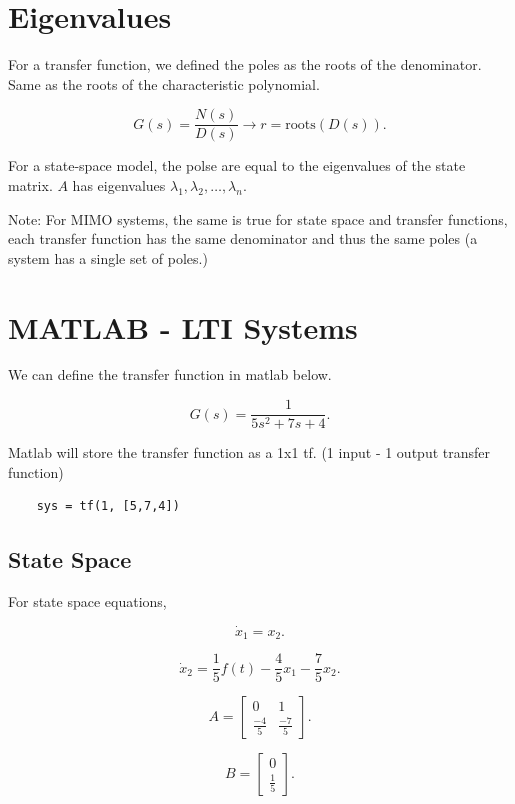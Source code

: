 \documentclass[12pt, a4paper]{report}
\begin{document}
  \section{Eigenvalues}

  For a transfer function, we defined the poles as the roots of the denominator. Same as the roots of the characteristic polynomial.

  \[
      G(s) = \frac{N(s)}{D(s)} \rightarrow r = \text{roots}(D(s))
    .\]

  For a state-space model, the polse are equal to the eigenvalues of the state matrix. $ A $ has eigenvalues $ \lambda_1, \lambda_2, \ldots, \lambda_n. $

  Note: For MIMO systems, the same is true for state space and transfer functions, each transfer function has the same denominator and thus the same poles (a system has a single set of poles.)

  \section{MATLAB - LTI Systems}

  We can define the transfer function in matlab below.

  \[
      G(s) = \frac{1}{5s^2 + 7s + 4}
    .\]

  Matlab will store the transfer function as a 1x1 tf. (1 input - 1 output transfer function)

  \begin{lstlisting}
    sys = tf(1, [5,7,4])
  \end{lstlisting}

  \subsection{State Space}


  For state space equations,

  \[
      \dot x_1 = x_2
    .\]

  \[
      \dot x_2 = \frac{1}{5}f(t) - \frac{4}{5}x_1 - \frac{7}{5}x_2
    .\]

  \[
    A =\begin{bmatrix}
        0 & 1\\
        \frac{-4}{5} & \frac{-7}{5}
      \end{bmatrix}
    .\]

  \[
    B =\begin{bmatrix}
        0\\
        \frac{1}{5}
      \end{bmatrix}
    .\]
\end{document}
